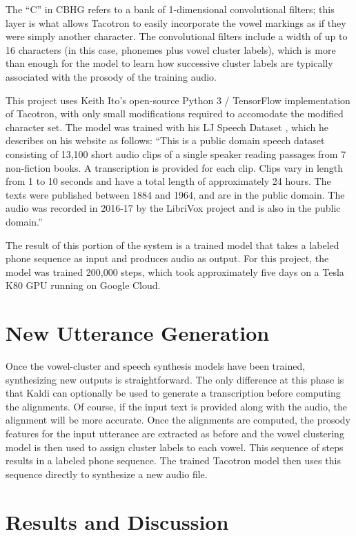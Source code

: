 \documentclass{article}
\begin{document}
The ``C'' in CBHG refers to a bank of 1-dimensional convolutional filters; this layer is what allows Tacotron to easily incorporate the vowel markings as if they were simply another character. The convolutional filters include a width of up to 16 characters (in this case, phonemes plus vowel cluster labels), which is more than enough for the model to learn how successive cluster labels are typically associated with the prosody of the training audio.

This project uses Keith Ito's open-source Python 3 / TensorFlow implementation of Tacotron, with only small modifications required to accomodate the modified character set. The model was trained with his LJ Speech Dataset \cite{ljspeech17}, which he describes on his website as follows:
``This is a public domain speech dataset consisting of 13,100 short audio clips of a single speaker reading passages from 7 non-fiction books. A transcription is provided for each clip. Clips vary in length from 1 to 10 seconds and have a total length of approximately 24 hours. The texts were published between 1884 and 1964, and are in the public domain. The audio was recorded in 2016-17 by the LibriVox project and is also in the public domain.''

The result of this portion of the system is a trained model that takes a labeled phone sequence as input and produces audio as output. For this project, the model was trained 200,000 steps, which took approximately five days on a Tesla K80 GPU running on Google Cloud.

\section{New Utterance Generation}
\label{sec:newuttgen}
Once the vowel-cluster and speech synthesis models have been trained, synthesizing new outputs is straightforward.
The only difference at this phase is that Kaldi can optionally be used to generate a transcription before computing the alignments.
Of course, if the input text is provided along with the audio, the alignment will be more accurate.
Once the alignments are computed, the prosody features for the input utterance are extracted as before and the vowel clustering model is then used to assign cluster labels to each vowel.
This sequence of steps results in a labeled phone sequence.
The trained Tacotron model then uses this sequence directly to synthesize a new audio file.

\section{Results and Discussion}
\label{sec:results}
\end{document}
